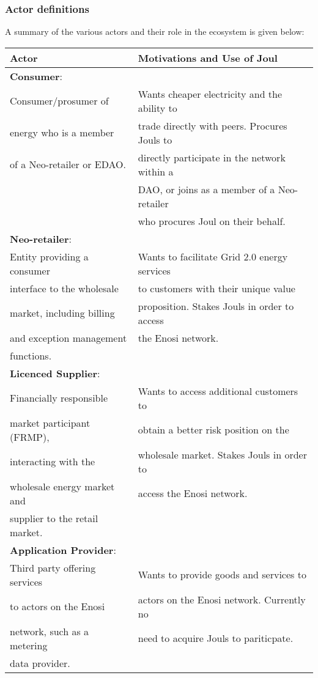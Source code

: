 \documentclass{article}
\newcommand{\head}[1]{\textnormal{\textbf{#1}}}
\theoremstyle{definition}
\theoremstyle{plain} %
\begin{document}
\subsubsection{Actor definitions}

A summary of the various actors and their role in the ecosystem is given below:\\


\begin{tabular}{|l|l|}
 \hline 	
 \head{Actor} & \head{Motivations and Use of Joul}\\
 \hline 
 \hline
 
 \textbf{Consumer}:				& \\
 \hline 
 Consumer/prosumer of 	 		& Wants cheaper electricity and the ability to	\\
 energy who is a member  		& trade directly with peers. Procures Jouls to	\\
 of a Neo-retailer or EDAO.		& directly participate in the network within a	\\
  								& DAO, or joins as a member of a Neo-retailer	\\
 								& who procures Joul on their behalf. 			\\
 \hline

 \textbf{Neo-retailer}:			& \\
 \hline
 Entity providing a consumer	& Wants to facilitate Grid 2.0 energy services	\\
 interface to the wholesale 	& to customers with their unique value 			\\
 market, including billing 		& proposition. Stakes Jouls in order to access 	\\
 and exception management 		& the Enosi network.							\\
 functions. 					& \\ 
 \hline 
 
 \textbf{Licenced Supplier}:	& \\ 
 \hline
 Financially responsible 		& Wants to access additional customers to 		\\
 market participant (FRMP), 	& obtain a better risk position on the			\\
 interacting with the 			& wholesale market. Stakes Jouls in order to 	\\
 wholesale energy market and 	& access the Enosi network.						\\
 supplier to the retail market.	& \\
 \hline 
 
 \textbf{Application Provider}:	& \\
 \hline 
 Third party offering services	& Wants to provide goods and services to 		\\
 to actors on the Enosi 		& actors on the Enosi network. Currently no 	\\
 network, such as a metering	& need to acquire Jouls to pariticpate.			\\
 data provider.					& \\
 \hline
 

\end{tabular}
\end{document}
